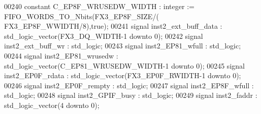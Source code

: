 \begin{DoxyCode}
00240 \textcolor{keywordflow}{constant} \textcolor{vhdlchar}{C_EP8F_WRUSEDW_WIDTH}    \textcolor{vhdlchar}{:} \textcolor{comment}{integer} \textcolor{vhdlchar}{:=} \textcolor{vhdlchar}{FIFO\_WORDS\_TO\_Nbits}\textcolor{vhdlchar}{(}\textcolor{vhdlchar}{FX3_EP8F_SIZE}\textcolor{vhdlchar}{/}\textcolor{vhdlchar}{(}\textcolor{vhdlchar}{
      FX3_EP8F_WWIDTH}\textcolor{vhdlchar}{/}\textcolor{vhdllogic}{}\textcolor{vhdllogic}{8}\textcolor{vhdlchar}{)}\textcolor{vhdlchar}{,}\textcolor{vhdlchar}{true}\textcolor{vhdlchar}{)};
00241 \textcolor{keywordflow}{signal} \textcolor{vhdlchar}{inst2_ext_buff_data}       \textcolor{vhdlchar}{:} \textcolor{comment}{std\_logic\_vector}\textcolor{vhdlchar}{(}\textcolor{vhdlchar}{FX3_DQ_WIDTH}\textcolor{vhdlchar}{-}\textcolor{vhdllogic}{}\textcolor{vhdllogic}{1} \textcolor{keywordflow}{downto} \textcolor{vhdllogic}{}\textcolor{vhdllogic}{0}\textcolor{vhdlchar}{)};
00242 \textcolor{keywordflow}{signal} \textcolor{vhdlchar}{inst2_ext_buff_wr}         \textcolor{vhdlchar}{:} \textcolor{comment}{std\_logic};
00243 \textcolor{keywordflow}{signal} \textcolor{vhdlchar}{inst2_EP81_wfull}          \textcolor{vhdlchar}{:} \textcolor{comment}{std\_logic};
00244 \textcolor{keywordflow}{signal} \textcolor{vhdlchar}{inst2_EP81_wrusedw}        \textcolor{vhdlchar}{:} \textcolor{comment}{std\_logic\_vector}\textcolor{vhdlchar}{(}\textcolor{vhdlchar}{C_EP81_WRUSEDW_WIDTH}\textcolor{vhdlchar}{-}\textcolor{vhdllogic}{}\textcolor{vhdllogic}{1} \textcolor{keywordflow}{downto} \textcolor{vhdllogic}{}\textcolor{vhdllogic}{0}\textcolor{vhdlchar}{)};
00245 \textcolor{keywordflow}{signal} \textcolor{vhdlchar}{inst2_EP0F_rdata}          \textcolor{vhdlchar}{:} \textcolor{comment}{std\_logic\_vector}\textcolor{vhdlchar}{(}\textcolor{vhdlchar}{FX3_EP0F_RWIDTH}\textcolor{vhdlchar}{-}\textcolor{vhdllogic}{}\textcolor{vhdllogic}{1} \textcolor{keywordflow}{downto} \textcolor{vhdllogic}{}\textcolor{vhdllogic}{0}\textcolor{vhdlchar}{)};
00246 \textcolor{keywordflow}{signal} \textcolor{vhdlchar}{inst2_EP0F_rempty}         \textcolor{vhdlchar}{:} \textcolor{comment}{std\_logic};
00247 \textcolor{keywordflow}{signal} \textcolor{vhdlchar}{inst2_EP8F_wfull}          \textcolor{vhdlchar}{:} \textcolor{comment}{std\_logic};
00248 \textcolor{keywordflow}{signal} \textcolor{vhdlchar}{inst2_GPIF_busy}           \textcolor{vhdlchar}{:} \textcolor{comment}{std\_logic};
00249 \textcolor{keywordflow}{signal} \textcolor{vhdlchar}{inst2_faddr}               \textcolor{vhdlchar}{:} \textcolor{comment}{std\_logic\_vector}\textcolor{vhdlchar}{(}\textcolor{vhdllogic}{}\textcolor{vhdllogic}{4} \textcolor{keywordflow}{downto} \textcolor{vhdllogic}{}\textcolor{vhdllogic}{0}\textcolor{vhdlchar}{)};

\end{DoxyCode}
